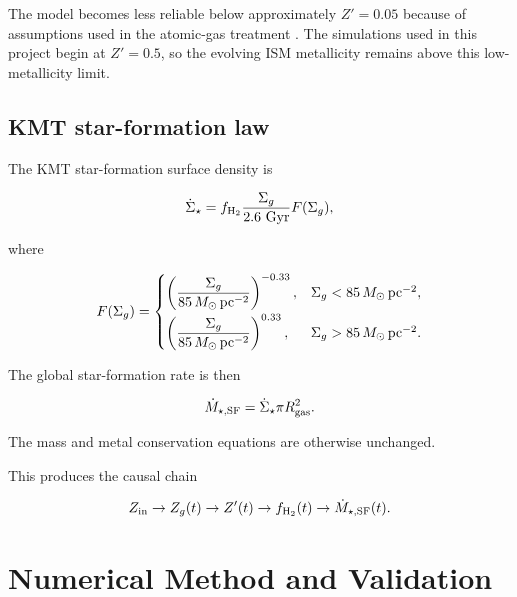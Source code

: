 \documentclass[10pt,a4paper]{article}
\newcommand{\SFR}{\dot{M}_{\star,\mathrm{SF}}}
\begin{document}
The model becomes less reliable below approximately \(Z'=0.05\) because of assumptions used in the atomic-gas treatment \cite{kmt2009sf}. The simulations used in this project begin at \(Z'=0.5\), so the evolving ISM metallicity remains above this low-metallicity limit.

\subsection{KMT star-formation law}

The KMT star-formation surface density is

\begin{equation}
\dot{\Sigma}_\star
=
f_{\rm H_2}
\frac{\Sigma_g}{2.6~{\rm Gyr}}
F(\Sigma_g),
\label{eq:kmt_sfr}
\end{equation}

where

\begin{equation}
F(\Sigma_g)
=
\begin{cases}
\left(
\dfrac{\Sigma_g}
{85\,M_\odot\,{\rm pc}^{-2}}
\right)^{-0.33},
&
\Sigma_g<85\,M_\odot\,{\rm pc}^{-2},
\\[8pt]
\left(
\dfrac{\Sigma_g}
{85\,M_\odot\,{\rm pc}^{-2}}
\right)^{0.33},
&
\Sigma_g>85\,M_\odot\,{\rm pc}^{-2}.
\end{cases}
\end{equation}

The global star-formation rate is then

\begin{equation}
\SFR
=
\dot{\Sigma}_\star
\pi R_{\rm gas}^2.
\end{equation}

The mass and metal conservation equations are otherwise unchanged.

This produces the causal chain

\begin{equation}
Z_{\rm in}
\rightarrow
Z_g(t)
\rightarrow
Z'(t)
\rightarrow
f_{\rm H_2}(t)
\rightarrow
\SFR(t).
\end{equation}

\section{Numerical Method and Validation}
\end{document}

